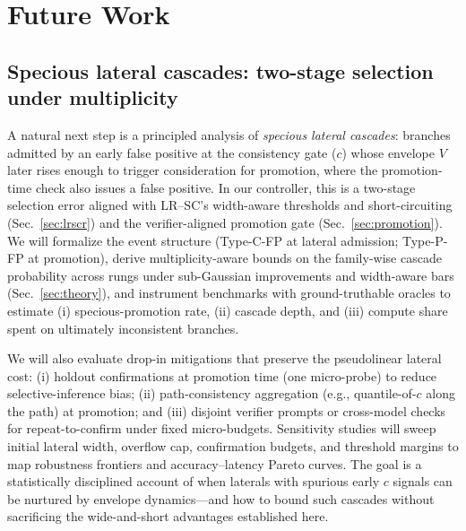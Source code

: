 \documentclass{article}
\begin{document}
\section{Future Work}
\label{section:future-work}

\subsection{Specious lateral cascades: two-stage selection under multiplicity}
\label{subsec:specious-cascades}

A natural next step is a principled analysis of \emph{specious lateral cascades}: branches admitted by an early false positive at the consistency gate (\(c\)) whose envelope \(V\) later rises enough to trigger consideration for promotion, where the promotion-time check also issues a false positive. In our controller, this is a two-stage selection error aligned with LR--SC’s width-aware thresholds and short-circuiting (Sec.~\ref{sec:lrscr}) and the verifier-aligned promotion gate (Sec.~\ref{sec:promotion}). We will formalize the event structure (Type-C-FP at lateral admission; Type-P-FP at promotion), derive multiplicity-aware bounds on the family-wise cascade probability across rungs under sub-Gaussian improvements and width-aware bars (Sec.~\ref{sec:theory}), and instrument benchmarks with ground-truthable oracles to estimate (i) specious-promotion rate, (ii) cascade depth, and (iii) compute share spent on ultimately inconsistent branches.

We will also evaluate drop-in mitigations that preserve the pseudolinear lateral cost: (i) holdout confirmations at promotion time (one micro-probe) to reduce selective-inference bias; (ii) path-consistency aggregation (e.g., quantile-of-\(c\) along the path) at promotion; and (iii) disjoint verifier prompts or cross-model checks for repeat-to-confirm under fixed micro-budgets. Sensitivity studies will sweep initial lateral width, overflow cap, confirmation budgets, and threshold margins to map robustness frontiers and accuracy–latency Pareto curves. The goal is a statistically disciplined account of when laterals with spurious early \(c\) signals can be nurtured by envelope dynamics—and how to bound such cascades without sacrificing the wide-and-short advantages established here.
\end{document}

